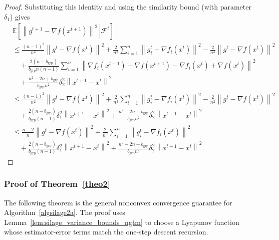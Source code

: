 \documentclass{article}
\newcommand{\sqn}[1]{\left\| #1 \right\|^2}
\newcommand{\Expb}[2]{\mathbb{E}\!\left[\left. #1\,\right|#2 \right]}
\newcommand{\Expc}[1]{\Expb{#1}{\mathcal{F}^t}}
\theoremstyle{plain}
\begin{document}
\begin{proof}
Substituting this identity and using the similarity bound (with parameter $\delta_1$) gives
\begin{align*}
&\Expc{ \sqn{g^{t+1}-\nabla f(x^{t+1})}}\\
&\leq\frac{(n-1)^2}{n^2} \sqn{g^t-\nabla f(x^{t})}
+\frac{2}{n^3}\sum_{i=1}^n\sqn{g_i^t-\nabla f_{i}(x^{t})}
-\frac{2}{n^2}\sqn{g^t-\nabla f(x^{t})}\\
&\quad+ \frac{2(n-b_{\mathrm{grp}})}{b_{\mathrm{grp}}n(n-1)}\sum_{i=1}^n \sqn{ \nabla f_{i}(x^{t+1})-\nabla f(x^{t+1})-\nabla f_{i}(x^{t})+\nabla f(x^{t})}\\
&\quad+\frac{n^2-2n+b_{\mathrm{grp}}}{b_{\mathrm{grp}}n^2}\delta_2^2\sqn{x^{t+1}-x^t}\\
&\leq\frac{(n-1)^2}{n^2} \sqn{g^t-\nabla f(x^{t})}
+\frac{2}{n^3}\sum_{i=1}^n\sqn{g_i^t-\nabla f_{i}(x^{t})}
-\frac{2}{n^2}\sqn{g^t-\nabla f(x^{t})}\\
&\quad+ \frac{2(n-b_{\mathrm{grp}})}{b_{\mathrm{grp}}(n-1)}\delta_1^2\sqn{x^{t+1}-x^t}
+\frac{n^2-2n+b_{\mathrm{grp}}}{b_{\mathrm{grp}}n^2}\delta_2^2\sqn{x^{t+1}-x^t}\\
&\leq\frac{n-2}{n} \sqn{g^t-\nabla f(x^{t})}+\frac{2}{n^3}\sum_{i=1}^n\sqn{g_i^t-\nabla f_{i}(x^{t})}\\
&\quad+ \frac{2(n-b_{\mathrm{grp}})}{b_{\mathrm{grp}}(n-1)}\delta_1^2\sqn{x^{t+1}-x^t}+\frac{n^2-2n+b_{\mathrm{grp}}}{b_{\mathrm{grp}}n^2}\delta_2^2\sqn{x^{t+1}-x^t}.
\end{align*}
\end{proof}


\subsubsection*{Proof of Theorem~\ref{theo2}}

The following theorem is the general nonconvex convergence guarantee for Algorithm~\ref{algsilage2a}.
The proof uses Lemma~\ref{lem:silage_variance_bounds_ngtm} to choose a Lyapunov function whose estimator-error terms match the one-step descent recursion.

\silageNgtMNC*
\end{document}
